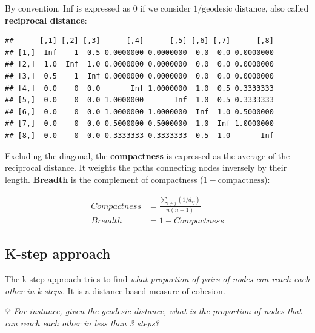 \documentclass[
  notitlepage,
  onecolumn,
  openany]{book}
\newenvironment{Shaded}{\begin{snugshade}}{\end{snugshade}}
\newcommand{\DecValTok}[1]{\textcolor[rgb]{0.00,0.00,0.81}{#1}}
\newcommand{\FunctionTok}[1]{\textcolor[rgb]{0.00,0.00,0.00}{#1}}
\newcommand{\NormalTok}[1]{#1}
\newcommand{\SpecialCharTok}[1]{\textcolor[rgb]{0.00,0.00,0.00}{#1}}
\begin{document}
By convention, Inf is expressed as 0 if we consider \(1/\text{geodesic distance}\), also called \textbf{reciprocal distance}:

\begin{Shaded}
\end{Shaded}

\begin{verbatim}
##      [,1] [,2] [,3]      [,4]      [,5] [,6] [,7]      [,8]
## [1,]  Inf    1  0.5 0.0000000 0.0000000  0.0  0.0 0.0000000
## [2,]  1.0  Inf  1.0 0.0000000 0.0000000  0.0  0.0 0.0000000
## [3,]  0.5    1  Inf 0.0000000 0.0000000  0.0  0.0 0.0000000
## [4,]  0.0    0  0.0       Inf 1.0000000  1.0  0.5 0.3333333
## [5,]  0.0    0  0.0 1.0000000       Inf  1.0  0.5 0.3333333
## [6,]  0.0    0  0.0 1.0000000 1.0000000  Inf  1.0 0.5000000
## [7,]  0.0    0  0.0 0.5000000 0.5000000  1.0  Inf 1.0000000
## [8,]  0.0    0  0.0 0.3333333 0.3333333  0.5  1.0       Inf
\end{verbatim}

Excluding the diagonal, the \textbf{compactness} is expressed as the average of the reciprocal distance. It weights the paths connecting nodes inversely by their length. \textbf{Breadth} is the complement of compactness (\(1-\text{compactness}\)):

\[
\begin{aligned}
Compactness &= \frac{\sum_{i\neq j} (1/d_{ij})}{n(n-1)}\\
Breadth &= 1-Compactness
\end{aligned}
\]

\hypertarget{k-step-approach}{%
\subsection{K-step approach}\label{k-step-approach}}

The k-step approach tries to find \emph{what proportion of pairs of nodes can reach each other in k steps.} It is a distance-based measure of cohesion.

💡 \emph{For instance, given the geodesic distance, what is the proportion of nodes that can reach each other in less than 3 steps?}
\end{document}
